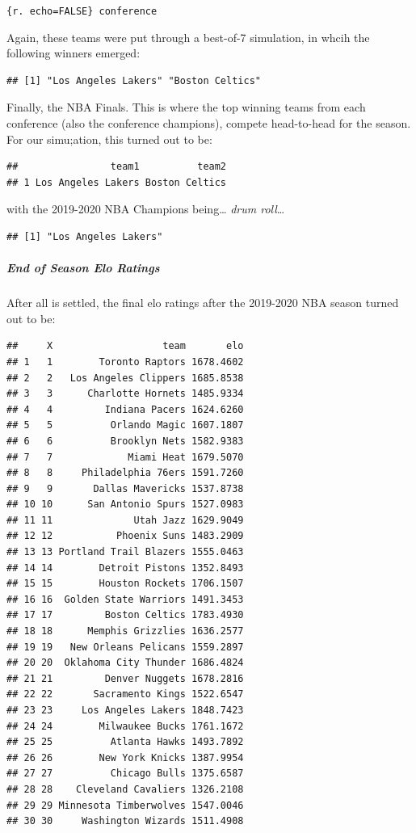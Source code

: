 \documentclass[]{article}
\let\oldsubparagraph\subparagraph
\renewcommand{\subparagraph}[1]{\oldsubparagraph{#1}\mbox{}}
\begin{document}
\texttt{\{r.\ echo=FALSE\}\ conference}

Again, these teams were put through a best-of-7 simulation, in whcih the
following winners emerged:

\begin{verbatim}
## [1] "Los Angeles Lakers" "Boston Celtics"
\end{verbatim}

Finally, the NBA Finals. This is where the top winning teams from each
conference (also the conference champions), compete head-to-head for the
season. For our simu;ation, this turned out to be:

\begin{verbatim}
##                team1          team2
## 1 Los Angeles Lakers Boston Celtics
\end{verbatim}

with the 2019-2020 NBA Champions being\ldots{} \emph{drum roll}\ldots{}

\begin{verbatim}
## [1] "Los Angeles Lakers"
\end{verbatim}

\hypertarget{end-of-season-elo-ratings}{%
\subparagraph{End of Season Elo
Ratings}\label{end-of-season-elo-ratings}}

After all is settled, the final elo ratings after the 2019-2020 NBA
season turned out to be:

\begin{verbatim}
##     X                   team       elo
## 1   1        Toronto Raptors 1678.4602
## 2   2   Los Angeles Clippers 1685.8538
## 3   3      Charlotte Hornets 1485.9334
## 4   4         Indiana Pacers 1624.6260
## 5   5          Orlando Magic 1607.1807
## 6   6          Brooklyn Nets 1582.9383
## 7   7             Miami Heat 1679.5070
## 8   8     Philadelphia 76ers 1591.7260
## 9   9       Dallas Mavericks 1537.8738
## 10 10      San Antonio Spurs 1527.0983
## 11 11              Utah Jazz 1629.9049
## 12 12           Phoenix Suns 1483.2909
## 13 13 Portland Trail Blazers 1555.0463
## 14 14        Detroit Pistons 1352.8493
## 15 15        Houston Rockets 1706.1507
## 16 16  Golden State Warriors 1491.3453
## 17 17         Boston Celtics 1783.4930
## 18 18      Memphis Grizzlies 1636.2577
## 19 19   New Orleans Pelicans 1559.2897
## 20 20  Oklahoma City Thunder 1686.4824
## 21 21         Denver Nuggets 1678.2816
## 22 22       Sacramento Kings 1522.6547
## 23 23     Los Angeles Lakers 1848.7423
## 24 24        Milwaukee Bucks 1761.1672
## 25 25          Atlanta Hawks 1493.7892
## 26 26        New York Knicks 1387.9954
## 27 27          Chicago Bulls 1375.6587
## 28 28    Cleveland Cavaliers 1326.2108
## 29 29 Minnesota Timberwolves 1547.0046
## 30 30     Washington Wizards 1511.4908
\end{verbatim}
\end{document}

